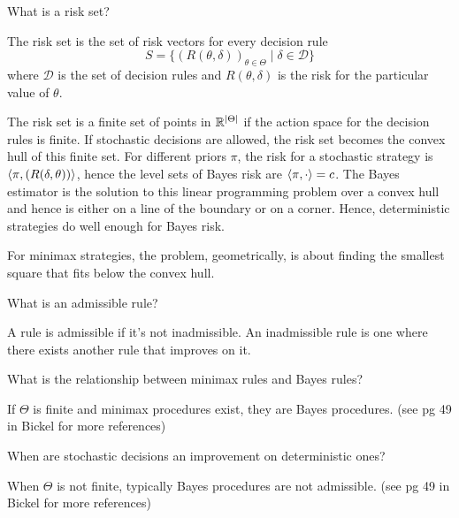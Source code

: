 \documentclass[avery5388,grid,frame]{flashcards}
\begin{document}
\begin{flashcard}
    {What is a risk set?}
    \begin{definition}
        The risk set is the set of risk vectors for every decision rule
        $$S = \{ (R(\theta,\delta))_{\theta \in \Theta} \mid \delta \in \mathcal D \}$$
        where $\mathcal D$ is the set of decision rules and $R(\theta,\delta)$ is the risk for the particular value of $\theta$.
    \end{definition}

    \begin{remark}
        The risk set is a finite set of points in $\mathbb{R}^{|\Theta|}$ if the action space for the decision rules is finite. If stochastic decisions are allowed, the risk set becomes the convex hull of this finite set. For different priors $\pi$, the risk for a stochastic strategy is $\langle \pi, (R(\delta,\theta)) \rangle$, hence the level sets of Bayes risk are $\langle \pi, \cdot \rangle = c$. The Bayes estimator is the solution to this linear programming problem over a convex hull and hence is either on a line of the boundary or on a corner. Hence, deterministic strategies do well enough for Bayes risk.
    \end{remark}

    \begin{remark}
        For minimax strategies, the problem, geometrically, is about finding the smallest square that fits below the convex hull.
    \end{remark}
\end{flashcard}


\begin{flashcard}
    {What is an admissible rule?}
    \begin{definition}
        A rule is admissible if it's not inadmissible. An inadmissible rule is one where there exists another rule that improves on it.
    \end{definition}
\end{flashcard}


\begin{flashcard}
    {What is the relationship between minimax rules and Bayes rules?}
    \begin{theorem}
        If $\Theta$ is finite and minimax procedures exist, they are Bayes procedures. (see pg 49 in Bickel for more references)
    \end{theorem}
\end{flashcard}


\begin{flashcard}
    {When are stochastic decisions an improvement on deterministic ones?}
    \begin{theorem}
        When $\Theta$ is not finite, typically Bayes procedures are not admissible. (see pg 49 in Bickel for more references)
    \end{theorem}
\end{flashcard}
\end{document}
